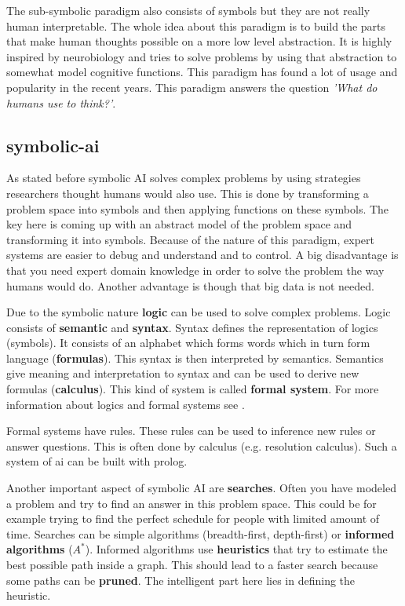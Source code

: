 \documentclass[jou,apacite]{apa6}
\begin{document}
The sub-symbolic paradigm also consists of symbols but they are not really human interpretable. The whole idea about this paradigm is to build the parts that make human thoughts possible on a more low level abstraction. It is highly inspired by neurobiology and tries to solve problems by using that abstraction to somewhat model cognitive functions. This paradigm has found a lot of usage and popularity in the recent years. This paradigm answers the question \textit{'What do humans use to think?'}.

\subsection{\gls{symbolic-ai}}
As stated before symbolic AI solves complex problems by using strategies researchers thought humans would also use. This is done by transforming a problem space into symbols and then applying functions on these symbols. The key here is coming up with an abstract model of the problem space and transforming it into symbols. Because of the nature of this paradigm, expert systems are easier to debug and understand and to control. A big disadvantage is that you need expert domain knowledge in order to solve the problem the way humans would do. Another advantage is though that big data is not needed.

Due to the symbolic nature \textbf{logic} can be used to solve complex problems. Logic consists of \textbf{semantic} and \textbf{syntax}. Syntax defines the representation of logics (symbols). It consists of an alphabet which forms words which in turn form language (\textbf{formulas}). This syntax is then interpreted by semantics. Semantics give meaning and interpretation to syntax and can be used to derive new formulas (\textbf{calculus}). This kind of system is called \textbf{formal system}. For more information about logics and formal systems see \cite{Richardson2006}. 

Formal systems have rules. These rules can be used to inference new rules or answer questions. This is often done by calculus (e.g. resolution calculus). Such a system of \gls{ai} can be built with \gls{prolog}.

Another important aspect of symbolic AI are \textbf{searches}. Often you have modeled a problem and try to find an answer in this problem space. This could be for example trying to find the perfect schedule for people with limited amount of time. Searches can be simple algorithms (breadth-first, depth-first) or \textbf{informed algorithms} ($A^*$). Informed algorithms use \textbf{heuristics} that try to estimate the best possible path inside a graph. This should lead to a faster search because some paths can be \textbf{pruned}. The intelligent part here lies in defining the heuristic.
\end{document}
